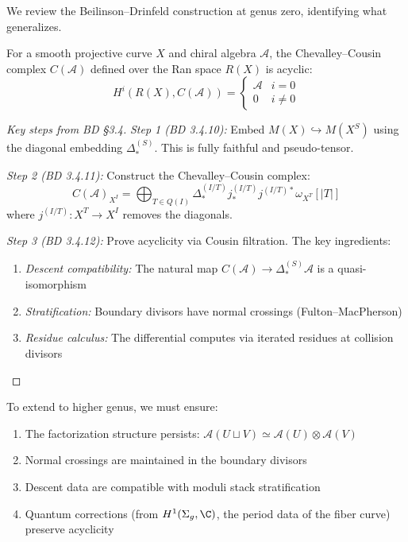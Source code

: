 We review the Beilinson--Drinfeld construction at genus zero, identifying what generalizes.

\begin{theorem}\label{thm:BD-genus-zero}
For a smooth projective curve $X$ and chiral algebra $\mathcal{A}$, the Chevalley--Cousin complex $C(\mathcal{A})$ defined over the Ran space $R(X)$ is acyclic:
\[H^i(R(X), C(\mathcal{A})) =
\begin{cases}
\mathcal{A} & i = 0 \\
0 & i \neq 0
\end{cases}\]
\end{theorem}

\begin{proof}[Key steps from BD §3.4]
\emph{Step 1 (BD 3.4.10):} Embed $M(X) \hookrightarrow M(X^S)$ using the diagonal embedding $\Delta^{(S)}_*$. This is fully faithful and pseudo-tensor.

\emph{Step 2 (BD 3.4.11):} Construct the Chevalley--Cousin complex:
\[C(\mathcal{A})_{X^I} = \bigoplus_{T \in Q(I)} \Delta^{(I/T)}_* j^{(I/T)}_* j^{(I/T)*} \omega_{X^T}[|T|]\]
where $j^{(I/T)}: X^T \to X^I$ removes the diagonals.

\emph{Step 3 (BD 3.4.12):} Prove acyclicity via Cousin filtration. The key ingredients:
\begin{enumerate}
\item \emph{Descent compatibility:} The natural map $C(\mathcal{A}) \to \Delta^{(S)}_* \mathcal{A}$ is a quasi-isomorphism
\item \emph{Stratification:} Boundary divisors have normal crossings (Fulton--MacPherson)
\item \emph{Residue calculus:} The differential computes via iterated residues at collision divisors
\end{enumerate}
\end{proof}

\begin{remark}\label{rem:what-to-preserve}
To extend to higher genus, we must ensure:
\begin{enumerate}
\item The factorization structure persists: $\mathcal{A}(U \sqcup V) \simeq \mathcal{A}(U) \otimes \mathcal{A}(V)$
\item Normal crossings are maintained in the boundary divisors
\item Descent data are compatible with moduli stack stratification
\item Quantum corrections (from $H^1(\Sigma_g, \C)$, the period data of the fiber curve) preserve acyclicity
\end{enumerate}
\end{remark}

